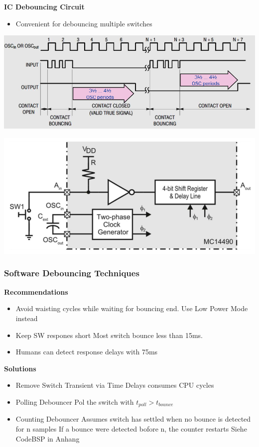 \textbf{IC Debouncing Circuit}\newline
\begin{minipage}{0.5\linewidth}
    \begin{itemize}
        \item Convenient for debouncing multiple switches
    \end{itemize}
    \includegraphics[width=0.8\linewidth]{images/HWDebounceICTiming}  
\end{minipage}
\begin{minipage}{0.5\linewidth}
    \includegraphics[width=0.9\linewidth]{images/HWDebounceIC}  
\end{minipage}
\subsubsection{Software Debouncing Techniques}
\begin{multicols}{2}
\textbf{Recommendations}
\begin{itemize}
    \item Avoid waisting cycles while waiting for bouncing end.
        \subitem Use Low Power Mode instead
    \item Keep SW respones short
        \subitem Most switch bounce less than 15ms.
    \item Humans can detect response delays with 75ms
\end{itemize}
\columnbreak
\textbf{Solutions}
\begin{itemize}
    \item Remove Switch Transient via Time Delays
        \subitem consumes \acs{CPU} cycles
    \item Polling Debouncer
        \subitem Pol the switch with $ t_{poll} > t_{bounce} $
    \item Counting Debouncer
        \subitem Assumes switch has settled when no bounce is detected for n samples
        \subitem If a bounce were detected bofore n, the counter restarts 
        \subitem Siehe CodeBSP in Anhang \label{CountingDebouncer}     
\end{itemize}
\end{multicols}
